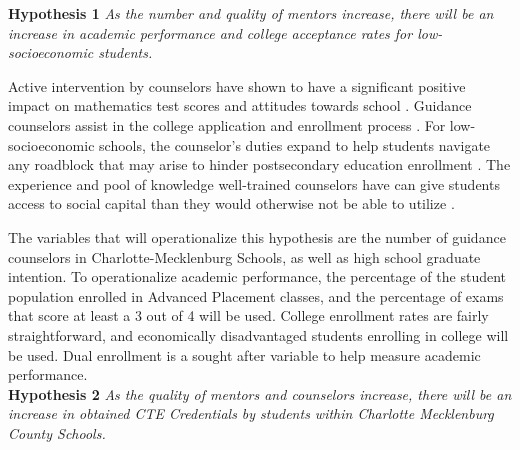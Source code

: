\textbf{Hypothesis 1} \textit{As the number and quality of mentors increase, there will be an increase in academic performance and college acceptance rates for low-socioeconomic students.}

Active intervention by counselors have shown to have a significant positive impact on mathematics test scores and attitudes towards school \parencite[][]{lee1993}. 
Guidance counselors assist in the college application and enrollment process \parencite[][]{deslonde2018high,tang2019high}.
For low-socioeconomic schools, the counselor's duties expand to help students navigate any roadblock that may arise to hinder postsecondary education enrollment \parencite{farmer2006, deslonde2018high}. 
The experience and pool of knowledge well-trained counselors have can give students access to social capital than they would otherwise not be able to utilize \parencite{tang2019high}.

The variables that will operationalize this hypothesis are the number of guidance counselors in Charlotte-Mecklenburg Schools, as well as high school graduate intention. 
To operationalize academic performance, the percentage of the student population enrolled in Advanced Placement classes, and the percentage of exams that score at least a 3 out of 4 will be used. 
College enrollment rates are fairly straightforward, and economically disadvantaged students enrolling in college will be used. Dual enrollment is a sought after variable to help measure academic performance. 
\\


\textbf{Hypothesis 2} \textit{As the quality of mentors and counselors increase, there will be an increase in obtained CTE Credentials by students within Charlotte Mecklenburg County Schools.}

